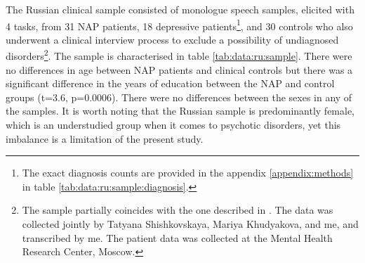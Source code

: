 The Russian clinical sample consisted of monologue speech samples, elicited with 4 tasks, from 31 NAP patients, 18 depressive patients\footnote{The exact diagnosis counts are provided in the appendix \ref{appendix:methods} in table \ref{tab:data:ru:sample:diagnosis}.}, and 30 controls who also underwent a clinical interview process to exclude a possibility of undiagnosed disorders\footnote{The sample partially coincides with the one described in \citet{ryazanskaya2020thesis}. The data was collected jointly by Tatyana Shishkovskaya, Mariya Khudyakova, and me, and transcribed by me. The patient data was collected at the Mental Health Research Center, Moscow.}. 
The sample is characterised in table \ref{tab:data:ru:sample}. There were no differences in age between NAP patients and clinical controls %
but there was a significant difference in the years of education between the NAP and control groups (t=3.6, p=0.0006). 
There were no differences between the sexes in any of the samples. It is worth noting that the Russian sample is predominantly female, which is an understudied group when it comes to psychotic disorders, yet this imbalance is a limitation of the present study.



